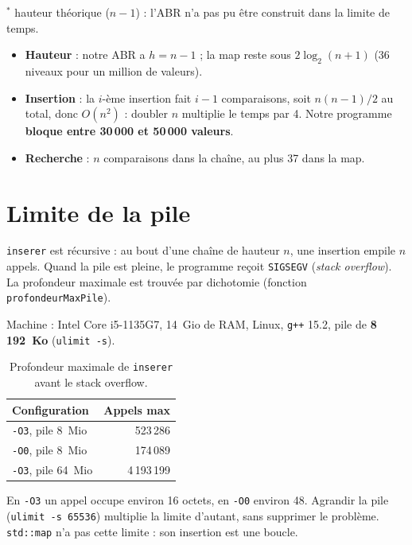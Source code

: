 \documentclass[11pt,a4paper]{article}
\begin{document}
{\small $^*$ hauteur théorique ($n-1$) : l'ABR n'a pas pu être construit dans la limite de temps.}

\begin{itemize}
  \item \textbf{Hauteur} : notre ABR a $h = n - 1$ ; la map reste sous $2\log_2(n+1)$
        (36 niveaux pour un million de valeurs).
  \item \textbf{Insertion} : la $i$-ème insertion fait $i-1$ comparaisons, soit
        $n(n-1)/2$ au total, donc $O(n^2)$ : doubler $n$ multiplie le temps par 4.
        Notre programme \textbf{bloque entre 30\,000 et 50\,000 valeurs}.
  \item \textbf{Recherche} : $n$ comparaisons dans la chaîne, au plus 37 dans la map.
\end{itemize}

\section{Limite de la pile}

\texttt{inserer} est récursive : au bout d'une chaîne de hauteur $n$, une insertion empile
$n$ appels. Quand la pile est pleine, le programme reçoit \texttt{SIGSEGV}
(\emph{stack overflow}). La profondeur maximale est trouvée par dichotomie (fonction
\texttt{profondeurMaxPile}).

Machine : Intel Core i5-1135G7, 14~Gio de RAM, Linux, \texttt{g++} 15.2,
pile de \textbf{8\,192~Ko} (\texttt{ulimit -s}).

\begin{table}[H]
\centering
\begin{tabular}{l r}
\toprule
\textbf{Configuration} & \textbf{Appels max} \\
\midrule
\texttt{-O3}, pile 8~Mio   & 523\,286 \\
\texttt{-O0}, pile 8~Mio   & 174\,089 \\
\texttt{-O3}, pile 64~Mio  & 4\,193\,199 \\
\bottomrule
\end{tabular}
\caption{Profondeur maximale de \texttt{inserer} avant le stack overflow.}
\end{table}

En \texttt{-O3} un appel occupe environ 16 octets, en \texttt{-O0} environ 48. Agrandir la
pile (\texttt{ulimit -s 65536}) multiplie la limite d'autant, sans supprimer le problème.
\texttt{std::map} n'a pas cette limite : son insertion est une boucle.
\end{document}

